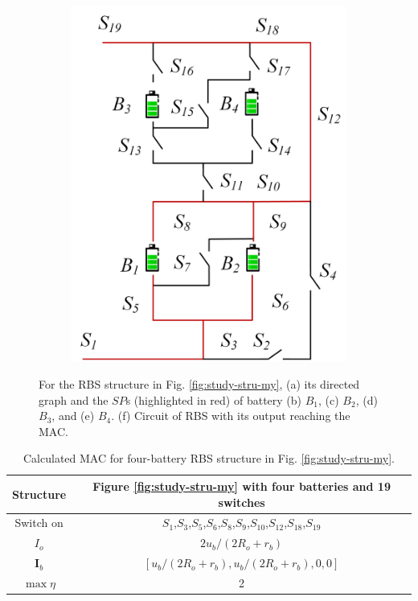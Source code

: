 \documentclass{article}
\begin{document}
\begin{figure}[htbp]
\begin{subfigure}[b]{0.28\textwidth}
        \includegraphics[width=\textwidth]{ef-mac.png}
        \caption{}
        \label{fig:study-results-my}
    \end{subfigure}
    \caption{
        For the RBS structure in Fig. \ref{fig:study-stru-my}, 
        (a) its directed graph 
        and the $SP$s (highlighted in red) of battery (b) $B_1$, (c) $B_2$, (d) $B_3$, and (e) $B_4$.
        (f) Circuit of RBS with its output reaching the MAC.
        }
    \label{fig:all-results-my}
\end{figure}

\begin{table}[htbp]
  \centering
    \caption{Calculated MAC for four-battery RBS structure in Fig. \ref{fig:study-stru-my}.}
    \begin{tabular}{cc}
    \toprule
        Structure & Figure \ref{fig:study-stru-my} with four batteries and 19 switches  \\
    \midrule
    Switch on & $S_1$,$S_3$,$S_5$,$S_6$,$S_8$,$S_9$,$S_{10}$,$S_{12}$,$S_{18}$,$S_{19}$ \\
    $I_o$ & $2u_b/(2R_o+r_b)$ \\
    $\bm{I}_b$ & $[u_b/(2R_o+r_b),u_b/(2R_o+r_b),0,0]$ \\
    $\max \eta$     & 2 \\
    \bottomrule
    \end{tabular}
  \label{tab:study-results-my}
\end{table}
\end{document}
